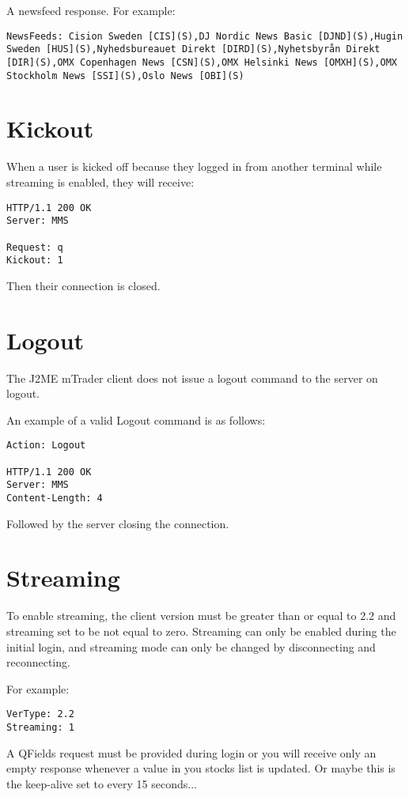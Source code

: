 \documentclass[12pt,twoside,letterpaper]{report}
\begin{document}
A newsfeed response. For example:
\begin{lstlisting}
NewsFeeds: Cision Sweden [CIS](S),DJ Nordic News Basic [DJND](S),Hugin Sweden [HUS](S),Nyhedsbureauet Direkt [DIRD](S),Nyhetsbyrån Direkt [DIR](S),OMX Copenhagen News [CSN](S),OMX Helsinki News [OMXH](S),OMX Stockholm News [SSI](S),Oslo News [OBI](S)
\end{lstlisting}

\section*{Kickout}
When a user is kicked off because they logged in from another terminal while streaming is enabled, they will receive:

\begin{verbatim}
HTTP/1.1 200 OK
Server: MMS

Request: q
Kickout: 1
\end{verbatim}

Then their connection is closed.

\section*{Logout}
The J2ME mTrader client does not issue a logout command to the server on logout.

An example of a valid Logout command is as follows:
\begin{verbatim}
Action: Logout

HTTP/1.1 200 OK
Server: MMS
Content-Length: 4
\end{verbatim}
Followed by the server closing the connection.

\section*{Streaming}
To enable streaming, the client version must be greater than or equal to 2.2 and streaming set to be not equal to zero. Streaming can only be enabled during the initial login, and streaming mode can only be changed by disconnecting and reconnecting.

For example:
\begin{verbatim}
VerType: 2.2
Streaming: 1
\end{verbatim}

A QFields request must be provided during login or you will receive only an empty response whenever a value in you stocks list is updated. Or maybe this is the keep-alive set to every 15 seconds...
\end{document}
